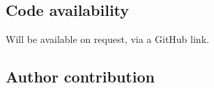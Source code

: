 \documentclass[referee, sn-mathphys-num]{sn-jnl}
\begin{document}
	\subsection*{Code availability}
	Will be available on request, via a GitHub link.
	\subsection*{Author contribution}
	
\end{document}

